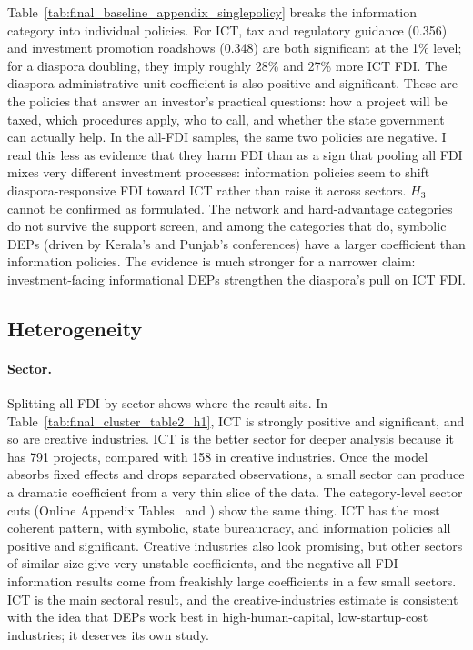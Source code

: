 \documentclass[12pt]{article}
\begin{document}


Table~\ref{tab:final_baseline_appendix_singlepolicy} breaks the information category into individual policies. For ICT, tax and regulatory guidance (0.356) and investment promotion roadshows (0.348) are both significant at the 1\% level; for a diaspora doubling, they imply roughly 28\% and 27\% more ICT FDI. The diaspora administrative unit coefficient is also positive and significant. These are the policies that answer an investor's practical questions: how a project will be taxed, which procedures apply, who to call, and whether the state government can actually help. In the all-FDI samples, the same two policies are negative. I read this less as evidence that they harm FDI than as a sign that pooling all FDI mixes very different investment processes: information policies seem to shift diaspora-responsive FDI toward ICT rather than raise it across sectors. $H_3$ cannot be confirmed as formulated. The network and hard-advantage categories do not survive the support screen, and among the categories that do, symbolic DEPs (driven by Kerala's and Punjab's conferences) have a larger coefficient than information policies. The evidence is much stronger for a narrower claim: investment-facing informational DEPs strengthen the diaspora's pull on ICT FDI.



\subsection{Heterogeneity}

\paragraph{Sector.} Splitting all FDI by sector shows where the result sits. In Table~\ref{tab:final_cluster_table2_h1}, ICT is strongly positive and significant, and so are creative industries. ICT is the better sector for deeper analysis because it has 791 projects, compared with 158 in creative industries. Once the model absorbs fixed effects and drops separated observations, a small sector can produce a dramatic coefficient from a very thin slice of the data. The category-level sector cuts (Online Appendix Tables~ and ) show the same thing. ICT has the most coherent pattern, with symbolic, state bureaucracy, and information policies all positive and significant. Creative industries also look promising, but other sectors of similar size give very unstable coefficients, and the negative all-FDI information results come from freakishly large coefficients in a few small sectors. ICT is the main sectoral result, and the creative-industries estimate is consistent with the idea that DEPs work best in high-human-capital, low-startup-cost industries; it deserves its own study.
\end{document}
